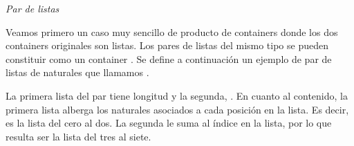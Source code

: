 \begin{example} {\it Par de listas}\label{ex:parlistas}

  Veamos primero un caso muy sencillo de producto de containers donde los dos containers originales son listas. Los pares de listas del mismo tipo se pueden constituir como un container . Se define a continuación un ejemplo de par de listas de naturales que llamamos .


La primera lista del par tiene longitud  y la segunda, . En cuanto al contenido, la primera lista alberga los naturales asociados a cada posición en la lista. Es decir, es la lista del cero al dos. La segunda le suma  al índice en la lista, por lo que resulta ser la lista del tres al siete.

\end{example}

